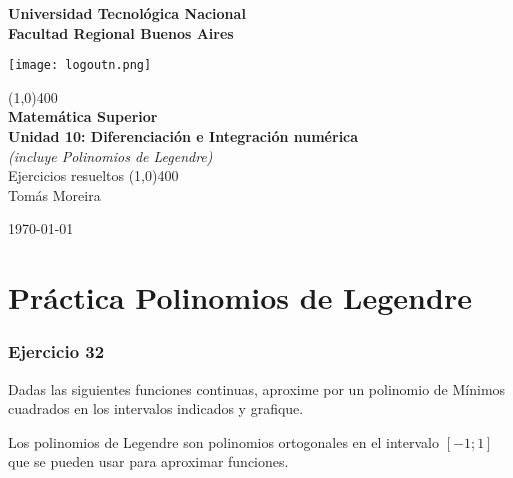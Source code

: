 \documentclass[11pt]{article}
\begin{document}
		
	\begin{titlepage}
		\begin{center}
			\vspace*{0.5cm}
			\Large{\textbf{Universidad Tecnológica Nacional}}\\
			\Large{\textbf{Facultad Regional Buenos Aires}}\\
			\begin{center}
				\texttt{[image: logoutn.png]}
			\end{center}
			\vfill
			\line(1,0){400}\\
			\vspace*{0.3cm}
			\huge{\textbf{Matemática Superior}}\\
			\Large{\textbf{Unidad 10: Diferenciación e Integración numérica}}\\
			\textit{\large{(incluye Polinomios de Legendre)}} \\
			\large{Ejercicios resueltos}
			\line(1,0){400}\\
			\vfill
			Tomás Moreira \\
			
			
			\today
				
				
		\end{center}
	\end{titlepage}

	\tableofcontents
	\thispagestyle{empty}
	\clearpage

	\setcounter{page}{1}
	
	\section{Práctica Polinomios de Legendre}
	\subsubsection{Ejercicio 32}
	Dadas las siguientes funciones continuas, aproxime por un polinomio de Mínimos cuadrados en los intervalos indicados y grafique.
	
	Los polinomios de Legendre son polinomios ortogonales en el intervalo $[-1;1]$ que se pueden usar para aproximar funciones.
	
\end{document}
